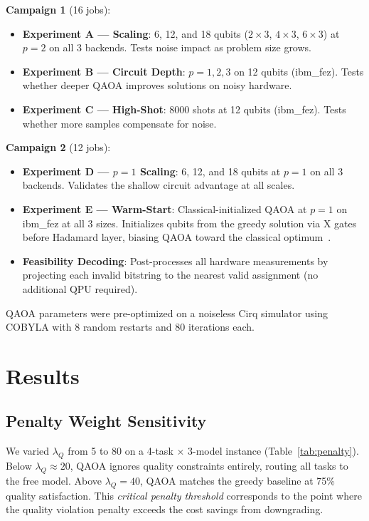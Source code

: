 \documentclass[conference]{IEEEtran}
\begin{document}
\textbf{Campaign 1} (16 jobs):
\begin{itemize}
    \item \textbf{Experiment A --- Scaling}: 6, 12, and 18 qubits ($2{\times}3$, $4{\times}3$, $6{\times}3$) at $p\!=\!2$ on all 3 backends. Tests noise impact as problem size grows.
    \item \textbf{Experiment B --- Circuit Depth}: $p=1,2,3$ on 12 qubits (ibm\_fez). Tests whether deeper QAOA improves solutions on noisy hardware.
    \item \textbf{Experiment C --- High-Shot}: 8000 shots at 12 qubits (ibm\_fez). Tests whether more samples compensate for noise.
\end{itemize}

\textbf{Campaign 2} (12 jobs):
\begin{itemize}
    \item \textbf{Experiment D --- $p\!=\!1$ Scaling}: 6, 12, and 18 qubits at $p\!=\!1$ on all 3 backends. Validates the shallow circuit advantage at all scales.
    \item \textbf{Experiment E --- Warm-Start}: Classical-initialized QAOA at $p\!=\!1$ on ibm\_fez at all 3 sizes. Initializes qubits from the greedy solution via X gates before Hadamard layer, biasing QAOA toward the classical optimum~\cite{egger2021warmstart}.
    \item \textbf{Feasibility Decoding}: Post-processes all hardware measurements by projecting each invalid bitstring to the nearest valid assignment (no additional QPU required).
\end{itemize}

QAOA parameters were pre-optimized on a noiseless Cirq simulator using COBYLA with 8 random restarts and 80 iterations each.

\section{Results}
\label{sec:results}

\subsection{Penalty Weight Sensitivity}
\label{sec:penalty}

We varied $\lambda_Q$ from 5 to 80 on a 4-task $\times$ 3-model instance (Table~\ref{tab:penalty}). Below $\lambda_Q \approx 20$, QAOA ignores quality constraints entirely, routing all tasks to the free model. Above $\lambda_Q = 40$, QAOA matches the greedy baseline at 75\% quality satisfaction. This \emph{critical penalty threshold} corresponds to the point where the quality violation penalty exceeds the cost savings from downgrading.
\end{document}
